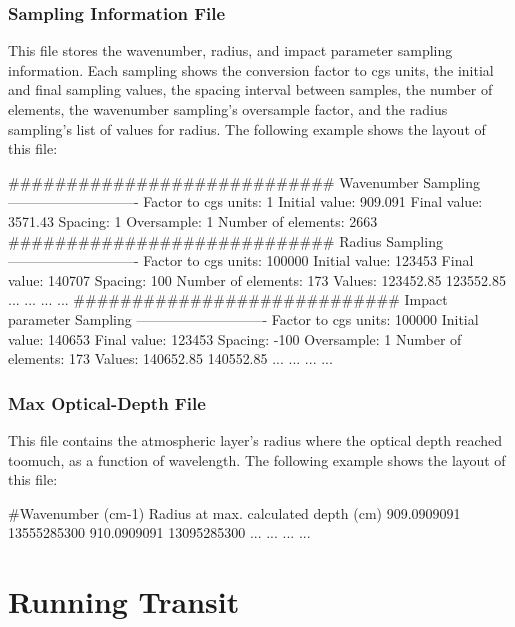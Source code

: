 \documentclass[letterpaper, 12pt]{article}
\begin{document}
\subsubsection{Sampling Information File}

This file stores the wavenumber, radius, and impact parameter sampling
information.  Each sampling shows the conversion factor to cgs units,
the initial and final sampling values, the spacing interval between
samples, the number of elements, the wavenumber sampling's oversample
factor, and the radius sampling's list of values for radius.  The
following example shows the layout of this file:
\begin{plain}
############################
   Wavenumber   Sampling
----------------------------
Factor to cgs units: 1
Initial value: 909.091
Final value: 3571.43
Spacing: 1
Oversample: 1
Number of elements: 2663
############################
   Radius       Sampling
----------------------------
Factor to cgs units: 100000
Initial value: 123453
Final value: 140707
Spacing: 100
Number of elements: 173
Values:     123452.85    123552.85    
              ...          ...
              ...          ...
############################
   Impact parameter Sampling
----------------------------
Factor to cgs units: 100000
Initial value: 140653
Final value: 123453
Spacing: -100
Oversample: 1
Number of elements: 173
Values:     140652.85    140552.85
              ...          ...
              ...          ...    
\end{plain}
\phantom{.\\}  %


\subsubsection{Max Optical-Depth File}

This file contains the atmospheric layer's
radius where the optical depth reached {\tttm toomuch}, as a function
of wavelength.  The following example shows the layout of this file:
\begin{plain}
#Wavenumber (cm-1)  Radius at max. calculated depth (cm)
909.0909091        13555285300
910.0909091        13095285300
     ...               ...
     ...               ...
\end{plain}
\phantom{.\\}  %

\section{Running Transit}
\label{sec:running}
\end{document}
